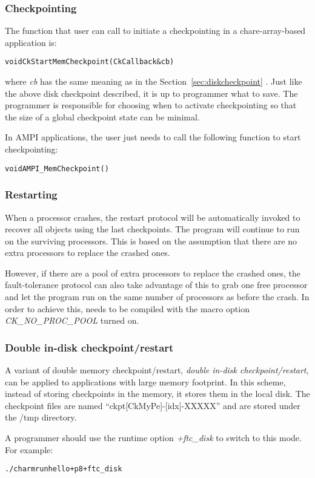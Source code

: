 \subsubsection{Checkpointing}

The function that user can call to initiate a checkpointing in a chare-array-based application is: 

\begin{alltt}
      void CkStartMemCheckpoint(CkCallback &cb)
\end{alltt}

where {\it cb} has the same meaning as in the Section~\ref{sec:diskcheckpoint} .
Just like the above disk checkpoint described, it is up to programmer what to save.
The programmer is responsible for choosing when to activate checkpointing so that
the size of a global checkpoint state can be minimal.

In AMPI applications, the user just needs to call the following function to 
start checkpointing:

\begin{alltt}
      void AMPI_MemCheckpoint()
\end{alltt}

\subsubsection{Restarting}

When a processor crashes, the restart protocol will be automatically
invoked to recover all objects using the last checkpoints. The program
will continue to run on the surviving processors. This is based on the assumption
that there are no extra processors to replace the crashed ones. 

However, if there are a pool of extra processors to replace the crashed ones, 
the fault-tolerance protocol can also take advantage of this to grab one
free processor and let the program run on the same number of processors 
as before the crash. 
In order to achieve this, \charmpp{} needs to be compiled with the macro option
 {\it CK\_NO\_PROC\_POOL} turned on.


\subsubsection{Double in-disk checkpoint/restart}

A variant of double memory checkpoint/restart,
{\it double in-disk checkpoint/restart},
can be applied to applications with large memory footprint.
In this scheme, instead of storing checkpoints in the memory, it stores 
them in the local disk.
The checkpoint files are named ``ckpt[CkMyPe]-[idx]-XXXXX'' and are stored under the /tmp directory.

A programmer should use the runtime option {\it +ftc\_disk} to switch to this mode.
For example:

\begin{alltt}
   ./charmrun hello +p8 +ftc_disk
\end{alltt} 


